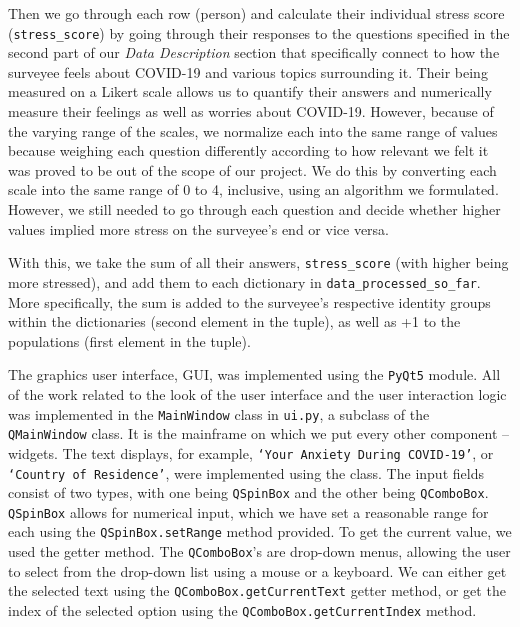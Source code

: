 \documentclass[fontsize=11pt]{article}
\begin{document}
    Then we go through each row (person) and calculate their individual stress score (\texttt{stress\_score}) by going through their responses to the questions specified in the second part of our \textit{Data Description} section that specifically connect to how the surveyee feels about COVID-19 and various topics surrounding it. Their being measured on a Likert scale allows us to quantify their answers and numerically measure their feelings as well as worries about COVID-19.
    However, because of the varying range of the scales, we normalize each into the same range of values because weighing each question differently according to how relevant we felt it was proved to be out of the scope of our project. We do this by converting each scale into the same range of 0 to 4, inclusive, using an algorithm we formulated.
    However, we still needed to go through each question and decide whether higher values implied more stress on the surveyee's end or vice versa.

    With this, we take the sum of all their answers, \texttt{stress\_score} (with higher being more stressed), and add them to each dictionary in \texttt{data\_processed\_so\_far}. More specifically, the sum is added to the surveyee’s respective identity groups within the dictionaries (second element in the tuple), as well as +1 to the populations (first element in the tuple).

    The graphics user interface, GUI, was implemented using the \texttt{PyQt5} module. All of the work related to the look of the user interface and the user interaction logic was implemented in the \texttt{MainWindow} class in \texttt{ui.py}, a subclass of the \texttt{QMainWindow} class. It is the mainframe on which we put every other component -- widgets. The text displays, for example, \texttt{`Your Anxiety During COVID-19'}, or \texttt{`Country of Residence'}, were implemented using the  class. The input fields consist of two types, with one being \texttt{QSpinBox} and the other being \texttt{QComboBox}. \texttt{QSpinBox} allows for numerical input, which we have set a reasonable range for each using the \texttt{QSpinBox.setRange} method provided. To get the current value, we used the  getter method. The \texttt{QComboBox}'s are drop-down menus, allowing the user to select from the drop-down list using a mouse or a keyboard. We can either get the selected text using the \texttt{QComboBox.getCurrentText} getter method, or get the index of the selected option using the \texttt{QComboBox.getCurrentIndex} method.
\end{document}
